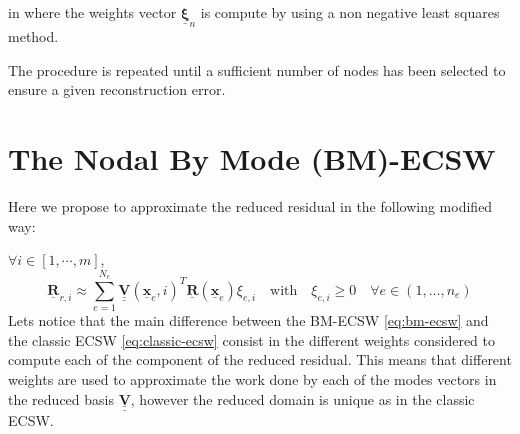 \documentclass[a4paper,12pt]{article}
\newcommand{\vect}[1]{\underline{\boldsymbol{#1}}}
\newcommand{\matr}[1]{\underline{\underline{\boldsymbol{#1}}}}
\begin{document}
in where the weights vector $\vect{\xi}_n$ is compute by using a non negative least squares method.

The procedure is repeated until a sufficient number of nodes has been selected to ensure a given reconstruction error.

\section{The Nodal By Mode (BM)-ECSW}
Here we propose to approximate the reduced residual in the following modified way:

\noindent$\forall i\in[1,\cdots,m],$
\begin{equation}
\vect{R}_{r,i}\approx
\sum_{e=1}^{N_e}\matr{V}(\vect{x}_e,i)^{T}\vect{R}(\vect{x}_e)\xi_{e,i}
\quad\text{with}\quad
\xi_{e,i}\geq 0\quad\forall e\in(1,\ldots,n_e)
\label{eq:bm-ecsw}
\end{equation}
Lets notice that the main difference between the BM-ECSW \eqref{eq:bm-ecsw} and the classic ECSW \eqref{eq:classic-ecsw} consist in the different weights considered to compute each of the component of the reduced residual. This means that different weights are used to approximate the work done by each of the modes vectors in the reduced basis $\matr{V}$, however the reduced domain is unique as in the classic ECSW.
\end{document}

